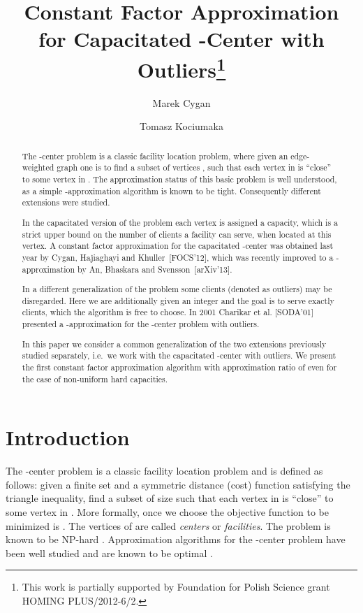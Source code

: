 \documentclass{article}
\title{Constant Factor Approximation\\ for Capacitated -Center with
Outliers\footnote{This work is partially supported by Foundation for Polish Science grant HOMING PLUS/2012-6/2.} }
\author{Marek Cygan}
\author{Tomasz Kociumaka}
\affil{Institute of Informatics, University of Warsaw, Poland\\
  \texttt{[cygan, kociumaka]@mimuw.edu.pl}}
\date{}
\theoremstyle{plain}
\theoremstyle{definition}
\begin{document}
\maketitle

\begin{abstract}
The -center problem is a classic facility location problem,
where given an edge-weighted graph  one is to find a subset 
of  vertices , such that each vertex in  is ``close''
to some vertex in . 
The approximation status of this basic problem is well understood,
as a simple -approximation algorithm is 
known to be tight. 
Consequently different extensions were studied.

In the capacitated version of the problem each vertex is assigned
a capacity, which is a strict upper bound on the number of clients
a facility can serve, when located at this vertex.
A constant factor approximation for the capacitated -center was obtained
last year by Cygan, Hajiaghayi and Khuller~[FOCS'12], which
was recently improved to a -approximation
by An, Bhaskara and Svensson~[arXiv'13].

In a different generalization of the problem some
clients (denoted as outliers) may be disregarded.
Here we are additionally given an integer  and the 
goal is to serve exactly  clients, which the algorithm
is free to choose.
In 2001 Charikar et al. [SODA'01] presented a -approximation
for the -center problem with outliers.

In this paper we consider a common generalization of the two
extensions previously studied separately, i.e.\ we work
with the capacitated -center with outliers. We present the first constant factor approximation algorithm
with approximation ratio of  even for the case of non-uniform hard capacities.
\end{abstract}

\section{Introduction}

The -center problem is a classic facility location problem and
is defined as follows: given a finite set  and a symmetric distance (cost)
function  satisfying the triangle inequality,
find a subset  of size  such that each vertex
in  is ``close'' to some vertex in . More formally, once we choose  
the objective function to be minimized is .
The vertices of  are called \emph{centers} or \emph{facilities}.
The problem is known to be NP-hard \cite{GJ}.  Approximation algorithms for the 
-center problem have been well studied and are known to be optimal \cite{Gonzalez,HS1,HS2,HN}. 
\end{document}
